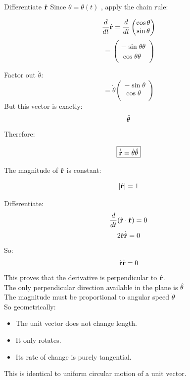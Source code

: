 \documentclass[14pt,a4paper]{article}
\begin{document}
Differentiate \( \hat{\vb{r}} \)
Since  \( \theta = \theta(t) \) , apply the chain rule:

\[
\frac{d}{dt}\hat{\vb{r}} =  \frac{d}{dt}
\begin{pmatrix}
\cos\theta\\
\sin\theta\\
\end{pmatrix}
\]
\[
=
\begin{pmatrix}
-\sin\theta\dot{\theta}\\
 \cos\theta\dot{\theta}\\
\end{pmatrix}
\]

Factor out \(\dot{\theta}\):
\[
=
\dot{\theta}
\begin{pmatrix}
-\sin\theta\\
\cos\theta\\
\end{pmatrix}
\]
But this vector is exactly:
\[ \hat{\vb{\theta}} \]
Therefore:

\[
\boxed{
\dot{\hat{\vb{r}}}=\dot{\theta}\hat{\vb{\theta}}
}
\]

The magnitude of \( \hat{\vb{r}} \) is constant:

\[ |\hat{\vb{r}}|=1 \]

Differentiate:
\[
\frac{d}{dt} (\hat{\vb{r}} \cdot \hat{\vb{r}}) = 0
\]
\[
2\hat{\vb{r}}\dot{\hat{\vb{r}}} = 0
\]
So:
\[
\hat{\vb{r}}\dot{\hat{\vb{r}}} = 0
\]
This proves that the derivative is perpendicular to \(\hat{\vb{r}}\).\\
The only perpendicular direction available in the plane is \(\hat{\vb{\theta}}\)\\
The magnitude must be proportional to angular speed \(\dot{\theta}\)\\
So geometrically:
\begin{itemize}
\item The unit vector does not change length.
\item It only rotates.
\item Its rate of change is purely tangential.
\end{itemize}
This is identical to uniform circular motion of a unit vector.
\end{document}
